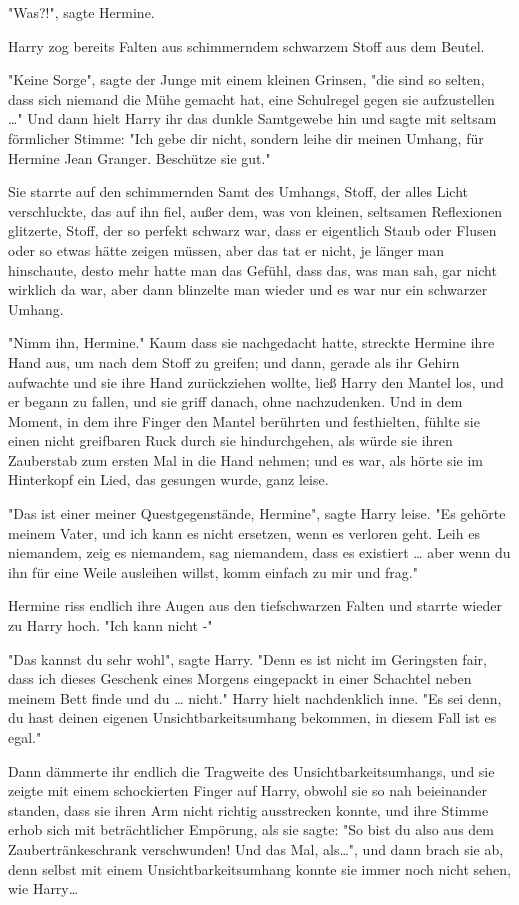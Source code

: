 {"Was?!", sagte Hermine.

Harry zog bereits Falten aus schimmerndem schwarzem Stoff aus dem Beutel.

"Keine Sorge", sagte der Junge mit einem kleinen Grinsen, "die sind so selten, dass sich niemand die Mühe gemacht hat, eine Schulregel gegen sie aufzustellen …" Und dann hielt Harry ihr das dunkle Samtgewebe hin und sagte mit seltsam förmlicher Stimme: "Ich gebe dir nicht, sondern leihe dir meinen Umhang, für Hermine Jean Granger. Beschütze sie gut."

Sie starrte auf den schimmernden Samt des Umhangs, Stoff, der alles Licht verschluckte, das auf ihn fiel, außer dem, was von kleinen, seltsamen Reflexionen glitzerte, Stoff, der so perfekt schwarz war, dass er eigentlich Staub oder Flusen oder so etwas hätte zeigen müssen, aber das tat er nicht, je länger man hinschaute, desto mehr hatte man das Gefühl, dass das, was man sah, gar nicht wirklich da war, aber dann blinzelte man wieder und es war nur ein schwarzer Umhang.

"Nimm ihn, Hermine." Kaum dass sie nachgedacht hatte, streckte Hermine ihre Hand aus, um nach dem Stoff zu greifen; und dann, gerade als ihr Gehirn aufwachte und sie ihre Hand zurückziehen wollte, ließ Harry den Mantel los, und er begann zu fallen, und sie griff danach, ohne nachzudenken. Und in dem Moment, in dem ihre Finger den Mantel berührten und festhielten, fühlte sie einen nicht greifbaren Ruck durch sie hindurchgehen, als würde sie ihren Zauberstab zum ersten Mal in die Hand nehmen; und es war, als hörte sie im Hinterkopf ein Lied, das gesungen wurde, ganz leise.

"Das ist einer meiner Questgegenstände, Hermine", sagte Harry leise. "Es gehörte meinem Vater, und ich kann es nicht ersetzen, wenn es verloren geht. Leih es niemandem, zeig es niemandem, sag niemandem, dass es existiert … aber wenn du ihn für eine Weile ausleihen willst, komm einfach zu mir und frag."

Hermine riss endlich ihre Augen aus den tiefschwarzen Falten und starrte wieder zu Harry hoch. "Ich kann nicht -"

"Das kannst du sehr wohl", sagte Harry. "Denn es ist nicht im Geringsten fair, dass ich dieses Geschenk eines Morgens eingepackt in einer Schachtel neben meinem Bett finde und du … nicht." Harry hielt nachdenklich inne. "Es sei denn, du hast deinen eigenen Unsichtbarkeitsumhang bekommen, in diesem Fall ist es egal."

Dann dämmerte ihr endlich die Tragweite des Unsichtbarkeitsumhangs, und sie zeigte mit einem schockierten Finger auf Harry, obwohl sie so nah beieinander standen, dass sie ihren Arm nicht richtig ausstrecken konnte, und ihre Stimme erhob sich mit beträchtlicher Empörung, als sie sagte: "So bist du also aus dem Zaubertränkeschrank verschwunden! Und das Mal, als…", und dann brach sie ab, denn selbst mit einem Unsichtbarkeitsumhang konnte sie immer noch nicht sehen, wie Harry…

}
